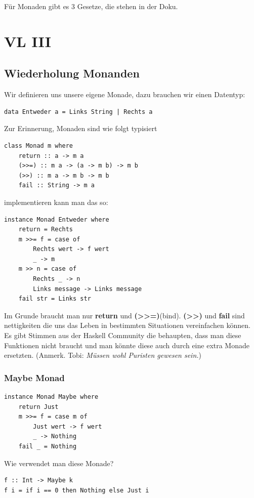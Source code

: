 \documentclass[ngerman,a4paper]{report}
\begin{document}
Für Monaden gibt es 3 Gesetze, die stehen in der Doku.

\chapter{VL III}
\section {Wiederholung Monanden}
Wir definieren uns unsere eigene Monade, dazu brauchen wir einen Datentyp:
\begin{lstlisting}
data Entweder a = Links String | Rechts a
\end{lstlisting}

Zur Erinnerung, Monaden sind wie folgt typisiert
\begin{lstlisting}
class Monad m where
	return :: a -> m a
	(>>=) :: m a -> (a -> m b) -> m b
	(>>) :: m a -> m b -> m b
	fail :: String -> m a
\end{lstlisting}

implementieren kann man das so:

\begin{lstlisting}
instance Monad Entweder where
	return = Rechts 
	m >>= f = case of
		Rechts wert -> f wert
		_ -> m
	m >> n = case of
		Rechts _ -> n
		Links message -> Links message 
	fail str = Links str
\end{lstlisting}

Im Grunde braucht man nur \textbf{return} und \textbf{(>>=)}(bind). \textbf{(>>)} und \textbf{fail} sind nettigkeiten die uns das Leben in bestimmten Situationen vereinfachen können. Es gibt Stimmen aus der Haskell Community die behaupten, dass man diese Funktionen nicht braucht und man könnte diese auch durch eine extra Monade ersetzten. (Anmerk. Tobi: \emph{Müssen wohl Puristen gewesen sein.})\\
\newpage
\subsection{Maybe Monad}
\begin{lstlisting}
instance Monad Maybe where
	return Just
	m >>= f = case m of
		Just wert -> f wert
		_ -> Nothing
	fail _ = Nothing
\end{lstlisting}

Wie verwendet man diese Monade?

\begin{lstlisting}
f :: Int -> Maybe k
f i = if i == 0 then Nothing else Just i
\end{lstlisting}
\end{document}
